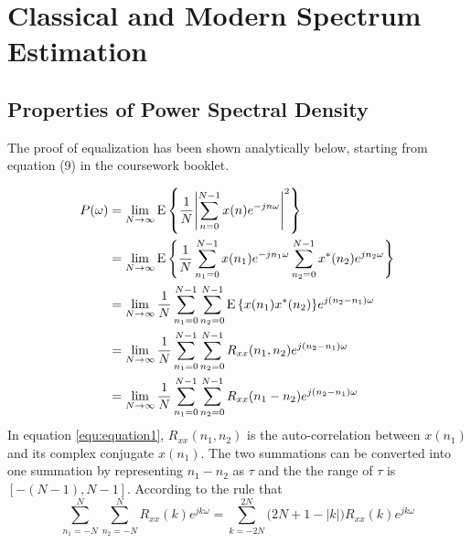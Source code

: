 \chapter{Classical and Modern Spectrum Estimation}


\section{Properties of Power Spectral Density}
The proof of equalization has been shown analytically below, starting from equation (9) in the coursework booklet. 
\item
\begin{equation}\label{equ:equation1}
\begin{aligned}
P(\omega ) &= \mathop {\lim }\limits_{N \to \infty } {\rm E}\left\{ {\frac{1}{N}{{\left| {\sum\limits_{n = 0}^{N - 1} {x(n){e^{ - jn\omega }}} } \right|}^2}} \right\}\\
 &= \mathop {\lim }\limits_{N \to \infty } {\rm E}\left\{ {\frac{1}{N}\sum\limits_{{n_1} = 0}^{N - 1} {x({n_1}){e^{ - j{n_1}\omega }}} \sum\limits_{{n_2} = 0}^{N - 1} {{x^*}({n_2}){e^{j{n_2}\omega }}} } \right\}\\
 &= \mathop {\lim }\limits_{N \to \infty } \frac{1}{N}\sum\limits_{{n_1} = 0}^{N - 1} {\sum\limits_{{n_2} = 0}^{N - 1} {{\rm E}\left\{ {x({n_1}){x^*}({n_2})} \right\}} } {e^{j\left( {{n_2} - {n_1}} \right)\omega }}\\
 &= \mathop {\lim }\limits_{N \to \infty } \frac{1}{N}\sum\limits_{{n_1} = 0}^{N - 1} {\sum\limits_{{n_2} = 0}^{N - 1} {{R_{xx}}({n_1},{n_2})} } {e^{j\left( {{n_2} - {n_1}} \right)\omega }}\\
 &= \mathop {\lim }\limits_{N \to \infty } \frac{1}{N}\sum\limits_{{n_1} = 0}^{N - 1} {\sum\limits_{{n_2} = 0}^{N - 1} {{R_{xx}}({n_1} - {n_2})} } {e^{j\left( {{n_2} - {n_1}} \right)\omega }}
\end{aligned}
\end{equation}
In equation \ref{equ:equation1}, ${R_{xx}}({n_1},{n_2})$ is the auto-correlation between $x(n_1)$ and  its complex conjugate $x(n_1)$. The two summations can be converted into one summation by representing $n_1-n_2$ as $\tau$ and the the range of $\tau$ is $[-(N-1),N-1]$. 
According to the rule that 
\begin{equation}
\sum\limits_{{n_1} =  - N}^N {\sum\limits_{{n_2} =  - N}^N {{R_{xx}}(k)} } {e^{jk\omega }} = \sum\limits_{k =  - 2N}^{2N} {(2N + 1 - \left| k \right|} ){R_{xx}}(k){e^{jk\omega }}
\end{equation}
